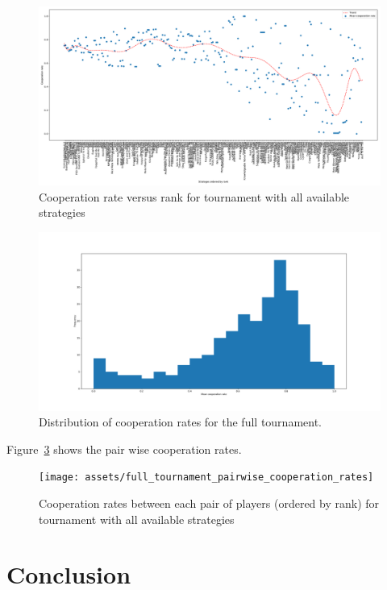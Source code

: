 \documentclass{article}
\begin{document}
\begin{figure}[!hbtp]
    \centering
    \includegraphics[width=.8\textwidth]{assets/full_tournament_cooperation_rate_versus_rank.pdf}
    \caption{Cooperation rate versus rank for tournament with all available
    strategies}
    \label{fig:full_tournament_cooperation_rate_versus_rank}
\end{figure}

\begin{figure}[!hbtp]
    \centering
    \includegraphics[width=.8\textwidth]{assets/full_tournament_cooperation_rates.pdf}
    \caption{Distribution of cooperation rates for the full tournament.}
    \label{fig:full_tournament_cooperation_rates}
\end{figure}

Figure~\ref{fig:full_tournament_pairwise_cooperation_rates} shows the pair wise
cooperation rates.

\begin{figure}[!hbtp]
    \centering
    \texttt{[image: assets/full\_tournament\_pairwise\_cooperation\_rates]}
    \caption{Cooperation rates between each pair of players (ordered by rank)
    for tournament with all available strategies}
    \label{fig:full_tournament_pairwise_cooperation_rates}
\end{figure}

\section{Conclusion}\label{sec:conclusion}
\end{document}
